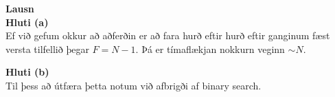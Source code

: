 \documentclass[12pt, a4paper, hidelinks]{article}
\begin{document}
\medskip
\noindent
\textbf{\large Lausn} \medskip \\
\textbf{Hluti (a)} \medskip \\
Ef við gefum okkur að aðferðin er að fara hurð eftir hurð eftir ganginum fæst versta tilfellið þegar
$F = N-1$. Þá er tímaflækjan nokkurn veginn $\sim N$.

\medskip
\noindent
\textbf{Hluti (b)} \medskip \\
Til þess að útfæra þetta notum við afbrigði af binary search.
\end{document}
